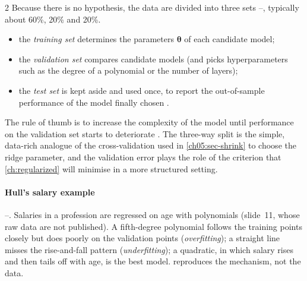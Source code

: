 \begin{paracol}{2}
Because there is no hypothesis, the data are divided into three sets --, typically about 60\%, 20\% and 20\%.
\begin{itemize}
  \item the \emph{training set} determines the parameters $\bm\theta$ of each candidate model;
  \item the \emph{validation set} compares candidate models (and picks hyperparameters such as the degree of a polynomial or
        the number of layers);
  \item the \emph{test set} is kept aside and used once, to report the out-of-sample performance of the model finally chosen
        .
\end{itemize}
The rule of thumb is to increase the complexity of the model until performance on the validation set starts
to deteriorate . The three-way split is the simple, data-rich analogue of the cross-validation used in
\cref{ch05:sec-shrink} to choose the ridge parameter, and the validation error plays the role of the criterion that
\cref{ch:regularized} will minimise in a more structured setting.

\paragraph{Hull's salary example} --. Salaries in a profession are regressed on age with polynomials
(slide~11, whose raw data are not published). A fifth-degree polynomial follows the training points closely but does poorly
on the validation points (\emph{overfitting}); a straight line misses the rise-and-fall pattern (\emph{underfitting}); a
quadratic, in which salary rises and then tails off with age, is the best model.  reproduces the
mechanism, not the data.


\end{paracol}
